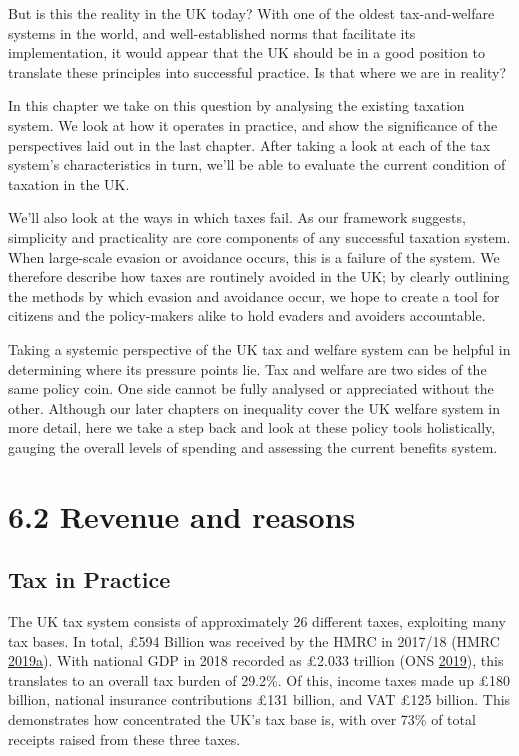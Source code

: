 \documentclass[]{tufte-handout}
\begin{document}
But is this the reality in the UK today? With one of the oldest
tax-and-welfare systems in the world, and well-established norms that
facilitate its implementation, it would appear that the UK should be in
a good position to translate these principles into successful practice.
Is that where we are in reality?

In this chapter we take on this question by analysing the existing
taxation system. We look at how it operates in practice, and show the
significance of the perspectives laid out in the last chapter. After
taking a look at each of the tax system's characteristics in turn, we'll
be able to evaluate the current condition of taxation in the UK.

We'll also look at the ways in which taxes fail. As our framework
suggests, simplicity and practicality are core components of any
successful taxation system. When large-scale evasion or avoidance
occurs, this is a failure of the system. We therefore describe how taxes
are routinely avoided in the UK; by clearly outlining the methods by
which evasion and avoidance occur, we hope to create a tool for citizens
and the policy-makers alike to hold evaders and avoiders accountable.

Taking a systemic perspective of the UK tax and welfare system can be
helpful in determining where its pressure points lie. Tax and welfare
are two sides of the same policy coin. One side cannot be fully analysed
or appreciated without the other. Although our later chapters on
inequality cover the UK welfare system in more detail, here we take a
step back and look at these policy tools holistically, gauging the
overall levels of spending and assessing the current benefits system.

\hypertarget{revenue-and-reasons}{%
\section{6.2 Revenue and reasons}\label{revenue-and-reasons}}

\hypertarget{tax-in-practice}{%
\subsection{Tax in Practice}\label{tax-in-practice}}

The UK tax system consists of approximately 26 different taxes,
exploiting many tax bases. In total, £594 Billion was received by the
HMRC in 2017/18 (HMRC
\protect\hyperlink{ref-HMRC2019}{2019}\protect\hyperlink{ref-HMRC2019}{a}).
With national GDP in 2018 recorded as £2.033 trillion (ONS
\protect\hyperlink{ref-ONS2019}{2019}), this translates to an overall
tax burden of 29.2\%. Of this, income taxes made up £180 billion,
national insurance contributions £131 billion, and VAT £125 billion.
This demonstrates how concentrated the UK's tax base is, with over 73\%
of total receipts raised from these three taxes.
\end{document}
